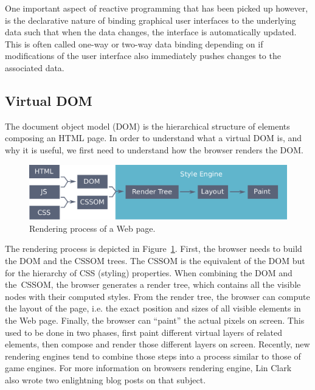 One important aspect of reactive programming that has been picked up however,
is the declarative nature of binding graphical user interfaces to the
underlying data such that when the data changes, the interface is automatically updated.
This is often called one-way or two-way data binding depending on if
modifications of the user interface also immediately pushes changes to the associated data.


\subsection{Virtual DOM}%
\label{sub:virtual_dom}

The document object model (DOM) is the hierarchical structure of elements
composing an HTML page.
In order to understand what a virtual DOM is, and why it is useful,
we first need to understand how the browser renders the DOM.

\begin{figure}[ht]
\includegraphics[width=\columnwidth]{assets/img/dom-rendering.pdf}
\caption{Rendering process of a Web page.}%
\label{fig:dom-rendering}
\end{figure}

The rendering process is depicted in Figure~\ref{fig:dom-rendering}.
First, the browser needs to build the DOM and the CSSOM trees.
The CSSOM is the equivalent of the DOM but for the hierarchy of CSS (styling) properties.
When combining the DOM and the CSSOM, the browser generates a render tree,
which contains all the visible nodes with their computed styles.
From the render tree, the browser can compute the layout of the page,
i.e. the exact position and sizes of all visible elements in the Web page.
Finally, the browser can ``paint'' the actual pixels on screen.
This used to be done in two phases,
first paint different virtual layers of related elements,
then compose and render those different layers on screen.
Recently, new rendering engines tend to combine those steps
into a process similar to those of game engines.
For more information on browsers rendering engine,
Lin Clark~\cite{clark-stylo, clark-webrender} also wrote
two enlightning blog posts on that subject.

